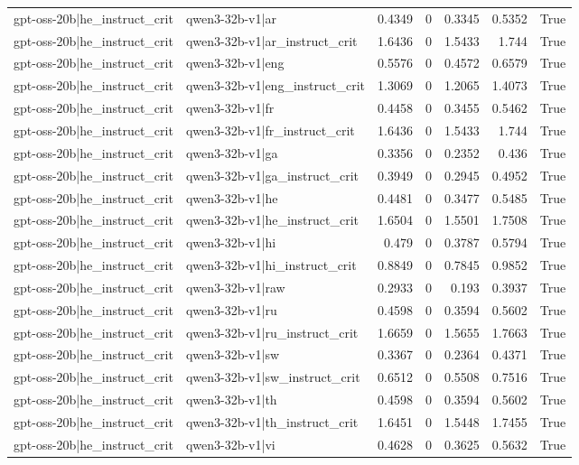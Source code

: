 \begin{table}
\begin{tabular}{l l r r r r l}
gpt-oss-20b|he_instruct_crit & qwen3-32b-v1|ar & 0.4349 & 0 & 0.3345 & 0.5352 & True \\
gpt-oss-20b|he_instruct_crit & qwen3-32b-v1|ar_instruct_crit & 1.6436 & 0 & 1.5433 & 1.744 & True \\
gpt-oss-20b|he_instruct_crit & qwen3-32b-v1|eng & 0.5576 & 0 & 0.4572 & 0.6579 & True \\
gpt-oss-20b|he_instruct_crit & qwen3-32b-v1|eng_instruct_crit & 1.3069 & 0 & 1.2065 & 1.4073 & True \\
gpt-oss-20b|he_instruct_crit & qwen3-32b-v1|fr & 0.4458 & 0 & 0.3455 & 0.5462 & True \\
gpt-oss-20b|he_instruct_crit & qwen3-32b-v1|fr_instruct_crit & 1.6436 & 0 & 1.5433 & 1.744 & True \\
gpt-oss-20b|he_instruct_crit & qwen3-32b-v1|ga & 0.3356 & 0 & 0.2352 & 0.436 & True \\
gpt-oss-20b|he_instruct_crit & qwen3-32b-v1|ga_instruct_crit & 0.3949 & 0 & 0.2945 & 0.4952 & True \\
gpt-oss-20b|he_instruct_crit & qwen3-32b-v1|he & 0.4481 & 0 & 0.3477 & 0.5485 & True \\
gpt-oss-20b|he_instruct_crit & qwen3-32b-v1|he_instruct_crit & 1.6504 & 0 & 1.5501 & 1.7508 & True \\
gpt-oss-20b|he_instruct_crit & qwen3-32b-v1|hi & 0.479 & 0 & 0.3787 & 0.5794 & True \\
gpt-oss-20b|he_instruct_crit & qwen3-32b-v1|hi_instruct_crit & 0.8849 & 0 & 0.7845 & 0.9852 & True \\
gpt-oss-20b|he_instruct_crit & qwen3-32b-v1|raw & 0.2933 & 0 & 0.193 & 0.3937 & True \\
gpt-oss-20b|he_instruct_crit & qwen3-32b-v1|ru & 0.4598 & 0 & 0.3594 & 0.5602 & True \\
gpt-oss-20b|he_instruct_crit & qwen3-32b-v1|ru_instruct_crit & 1.6659 & 0 & 1.5655 & 1.7663 & True \\
gpt-oss-20b|he_instruct_crit & qwen3-32b-v1|sw & 0.3367 & 0 & 0.2364 & 0.4371 & True \\
gpt-oss-20b|he_instruct_crit & qwen3-32b-v1|sw_instruct_crit & 0.6512 & 0 & 0.5508 & 0.7516 & True \\
gpt-oss-20b|he_instruct_crit & qwen3-32b-v1|th & 0.4598 & 0 & 0.3594 & 0.5602 & True \\
gpt-oss-20b|he_instruct_crit & qwen3-32b-v1|th_instruct_crit & 1.6451 & 0 & 1.5448 & 1.7455 & True \\
gpt-oss-20b|he_instruct_crit & qwen3-32b-v1|vi & 0.4628 & 0 & 0.3625 & 0.5632 & True \\

\end{tabular}
\end{table}
